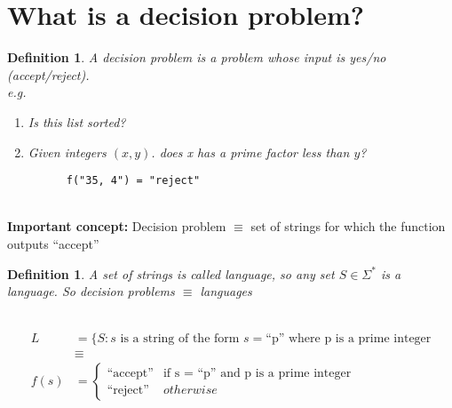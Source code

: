 \documentclass[twoside]{article}
\newtheorem{definition}[theorem]{Definition}
\begin{document}
\section{What is a decision problem?}
\begin{definition}
  A \emph{decision problem} is a problem whose input is yes/no (accept/reject). \\
  e.g.
  \begin{enumerate}
    \item Is this list sorted?
    \item Given integers $(x, y)$. does x has a prime factor less than $y$?
    \begin{verbatim}
      f("35, 4") = "reject"
    \end{verbatim} 
  \end{enumerate}
\end{definition} \
\\
\textbf{Important concept:} Decision problem $\equiv$ set of strings for which the function outputs ``accept'' 
\begin{definition}
  A set of strings is called \emph{language}, so any set $S \in \Sigma^*$ is a language. So decision problems $\equiv$ languages
\end{definition}\
\\
\begin{equation*}
  \begin{aligned}
    L &= \{S: s \text{ is a string of the form } s=\text{``p'' where p is a prime integer} \\
    &\equiv \\
    f(s) &= 
    \begin{cases}
      \text{``accept''} & \text{if s = ``p'' and p is a prime integer} \\
      \text{``reject''} & otherwise
    \end{cases} 
  \end{aligned}
\end{equation*}
\end{document}
